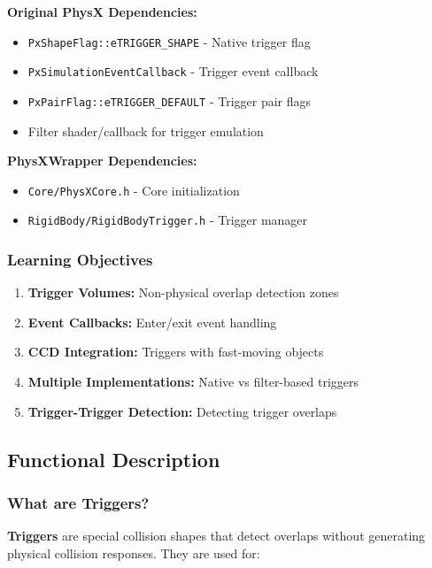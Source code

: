 \textbf{Original PhysX Dependencies:}
\begin{itemize}
    \item \texttt{PxShapeFlag::eTRIGGER\_SHAPE} - Native trigger flag
    \item \texttt{PxSimulationEventCallback} - Trigger event callback
    \item \texttt{PxPairFlag::eTRIGGER\_DEFAULT} - Trigger pair flags
    \item Filter shader/callback for trigger emulation
\end{itemize}

\textbf{PhysXWrapper Dependencies:}
\begin{itemize}
    \item \texttt{Core/PhysXCore.h} - Core initialization
    \item \texttt{RigidBody/RigidBodyTrigger.h} - Trigger manager
\end{itemize}

\subsubsection{Learning Objectives}

\begin{enumerate}
    \item \textbf{Trigger Volumes:} Non-physical overlap detection zones
    \item \textbf{Event Callbacks:} Enter/exit event handling
    \item \textbf{CCD Integration:} Triggers with fast-moving objects
    \item \textbf{Multiple Implementations:} Native vs filter-based triggers
    \item \textbf{Trigger-Trigger Detection:} Detecting trigger overlaps
\end{enumerate}


\subsection{Functional Description}

\subsubsection{What are Triggers?}

\textbf{Triggers} are special collision shapes that detect overlaps without generating physical collision responses. They are used for:

